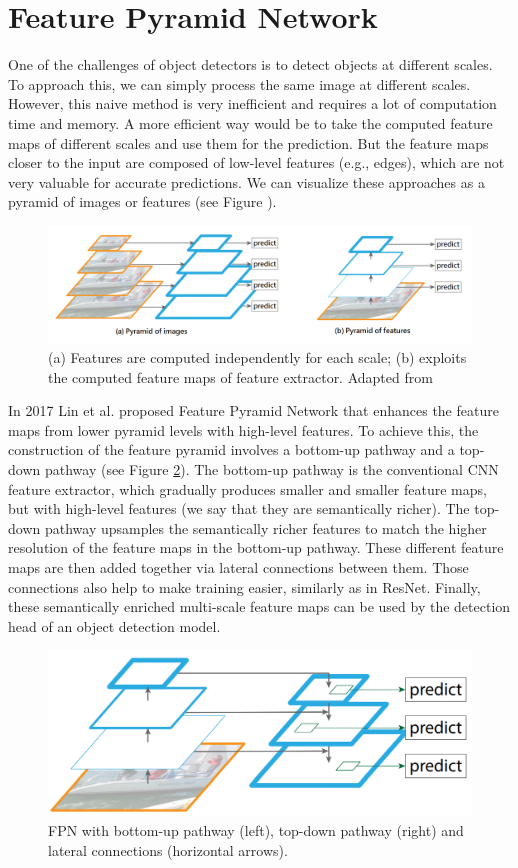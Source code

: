 \section{Feature Pyramid Network}
One of the challenges of object detectors is to detect objects at different scales. To approach this, we can simply process the same image at different scales. However, this naive method is very inefficient and requires a lot of computation time and memory. A more efficient way would be to take the computed feature maps of different scales and use them for the prediction. But the feature maps closer to the input are composed of low-level features (e.g., edges), which are not very valuable for accurate predictions. We can visualize these approaches as a pyramid of images or features (see Figure ). 

\begin{figure}[h]
    \centering
    \includegraphics[width=\linewidth]{Sources/Figures/pyramids.png}
    \caption{(a) Features are computed independently for each scale; (b) exploits the computed feature maps of feature extractor. Adapted from }
    \label{fig:pyramids}
\end{figure}

In 2017 Lin et al. proposed Feature Pyramid Network that enhances the feature maps from lower pyramid levels with high-level features. To achieve this, the construction of the feature pyramid involves a bottom-up pathway and a top-down pathway (see Figure \ref{fig:fpn}). The bottom-up pathway is the conventional CNN feature extractor, which gradually produces smaller and smaller feature maps, but with high-level features (we say that they are semantically richer). The top-down pathway upsamples the semantically richer features to match the higher resolution of the feature maps in the bottom-up pathway. These different feature maps are then added together via lateral connections between them. Those connections also help to make training easier, similarly as in ResNet.  Finally, these semantically enriched multi-scale feature maps can be used by the detection head of an object detection model. 

\begin{figure}[h]
    \centering
    \includegraphics[width=0.6\linewidth]{Sources/Figures/fpn.png}
    \caption{FPN with bottom-up pathway (left), top-down pathway (right) and lateral connections (horizontal arrows).}
    \label{fig:fpn}
\end{figure}

